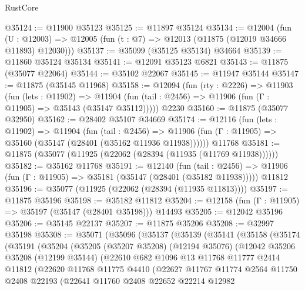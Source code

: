 \begin{lexlean}{RustCore}
\begin{coremodule}
@35124 := @11900 @35123
@35125 := @11897 @35124
@35134 := @12004
    (fun (U : @12003) => @12005 (fun (t : @7) => @12013 (@11875 (@12019 @34666 @11893) @12030)))
@35137 := @35099 (@35125 @35134) @34664
@35139 := @11860 @35124 @35134
@35141 := @12091 @35123 @6821
@35143 := @11875 (@35077 @22064)
@35144 := @35102 @22067
@35145 := @11947 @35144
@35147 := @11875 (@35145 @11968)
@35158 := @12094
    (fun (rty : @2226) =>
    @11903
      (fun (lets : @11902) =>
      @11904 (fun (tail : @2456) => @11906 (fun (Γ : @11905) => @35143 (@35147 @35112)))))
    @2230
@35160 := @11875 (@35077 @32950)
@35162 := @28402 @35107 @34669
@35174 := @12116
    (fun (lets : @11902) =>
    @11904
      (fun (tail : @2456) =>
      @11906 (fun (Γ : @11905) => @35160 (@35147 (@28401 (@35162 @11936 @11938))))))
    @11768
@35181 := @11875 (@35077 (@11925 (@22062 (@28394 (@11935 (@11769 @11938))))))
@35182 := @35162 @11768
@35191 := @12140
    (fun (tail : @2456) => @11906 (fun (Γ : @11905) => @35181 (@35147 (@28401 (@35182 @11938)))))
    @11812
@35196 := @35077 (@11925 (@22062 (@28394 (@11935 @11813))))
@35197 := @11875 @35196
@35198 := @35182 @11812
@35204 := @12158 (fun (Γ : @11905) => @35197 (@35147 (@28401 @35198))) @14493
@35205 := @12042 @35196
@35206 := @35145 @22137
@35207 := @11875 @35206
@35208 := @32997 @35198
@35308 := @35071
    (@35096
      (@35137
        (@35139
          (@35141
            (@35158
              (@35174
                (@35191
                  (@35204
                    (@35205
                      (@35207 @35208)
                      (@12194 @35076)
                      (@12042
                        @35206
                        @35208
                        (@12199 @35144)
                        (@22610
                          @682
                          @1096
                          @13
                          @11768
                          @11777
                          @2414
                          @11812
                          (@22620
                            @11768
                            @11775
                            @4410
                            (@22627
                              @11767
                              @11774
                              @2564
                              @11750
                              @2408
                              @22193
                              (@22641
                                @11760
                                @2408
                                @22652
                                @22214
                                @12982

\end{coremodule}
\end{lexlean}
